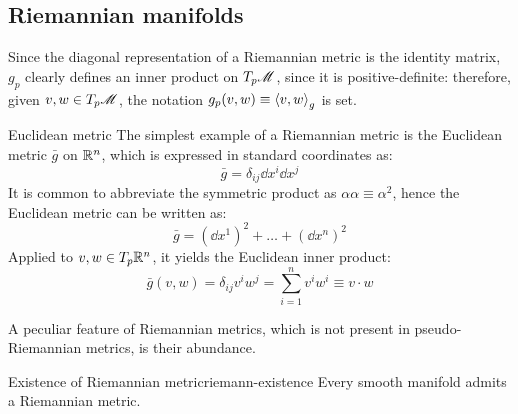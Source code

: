 \subsection{Riemannian manifolds}

Since the diagonal representation of a Riemannian metric is the identity matrix, $ g_p $ clearly defines an inner product on $ T_p\mathscr{M} $, since it is positive-definite: therefore, given $ v,w \in T_p\mathscr{M} $, the notation $ g_p(v,w) \equiv \braket{v,w}_g $ is set.

\begin{example}{Euclidean metric}{}
  The simplest example of a Riemannian metric is the Euclidean metric $ \bar{g} $ on $ \mathbb{R}^n $, which is expressed in standard coordinates as:
  \begin{equation*}
    \bar{g} = \delta_{ij} \dd x^i \dd x^j
  \end{equation*}
  It is common to abbreviate the symmetric product as $ \alpha \alpha \equiv \alpha^2 $, hence the Euclidean metric can be written as:
  \begin{equation*}
    \bar{g} = (\dd x^1)^2 + \dots + (\dd x^n)^2
  \end{equation*}
  Applied to $ v,w \in T_p\mathbb{R}^n $, it yields the Euclidean inner product:
  \begin{equation*}
    \bar{g}(v,w) = \delta_{ij} v^i w^j = \sum_{i = 1}^n v^i w^i \equiv v \cdot w
  \end{equation*}
\end{example}

A peculiar feature of Riemannian metrics, which is not present in pseudo-Riemannian metrics, is their abundance.

\begin{theorem}{Existence of Riemannian metric}{riemann-existence}
  Every smooth manifold admits a Riemannian metric.
\end{theorem}


